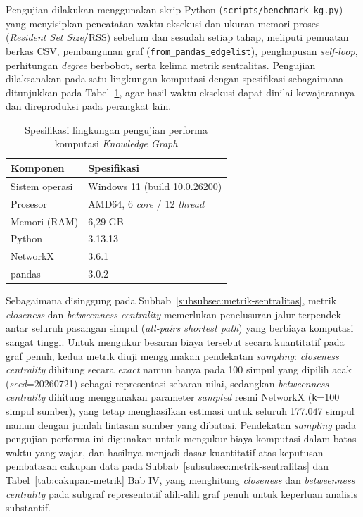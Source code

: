 Pengujian dilakukan menggunakan skrip Python (\texttt{scripts/}\allowbreak\texttt{benchmark\_kg.py}) yang menyisipkan pencatatan waktu eksekusi dan ukuran memori proses (\textit{Resident Set Size}/RSS) sebelum dan sesudah setiap tahap, meliputi pemuatan berkas CSV, pembangunan graf (\texttt{from\_pandas\_}\allowbreak\texttt{edgelist}), penghapusan \textit{self-loop}, perhitungan \textit{degree} berbobot, serta kelima metrik sentralitas. Pengujian dilaksanakan pada satu lingkungan komputasi dengan spesifikasi sebagaimana ditunjukkan pada Tabel~\ref{tab:lingkungan-benchmark}, agar hasil waktu eksekusi dapat dinilai kewajarannya dan direproduksi pada perangkat lain.

\begin{table}[H]
\centering
\caption{Spesifikasi lingkungan pengujian performa komputasi \textit{Knowledge Graph}}
\label{tab:lingkungan-benchmark}
\renewcommand{\arraystretch}{1.3}
\begin{tabular}{|l|l|}
\hline
\textbf{Komponen} & \textbf{Spesifikasi} \\
\hline
Sistem operasi & Windows 11 (build 10.0.26200) \\
\hline
Prosesor & AMD64, 6 \textit{core} / 12 \textit{thread} \\
\hline
Memori (RAM) & 6,29 GB \\
\hline
Python & 3.13.13 \\
\hline
NetworkX & 3.6.1 \\
\hline
pandas & 3.0.2 \\
\hline
\end{tabular}
\end{table}

\begin{sloppypar}
Sebagaimana disinggung pada Subbab~\ref{subsubsec:metrik-sentralitas}, metrik \textit{closeness} dan \textit{betweenness centrality} memerlukan penelusuran jalur terpendek antar seluruh pasangan simpul (\textit{all-pairs shortest path}) yang berbiaya komputasi sangat tinggi. Untuk mengukur besaran biaya tersebut secara kuantitatif pada graf penuh, kedua metrik diuji menggunakan pendekatan \textit{sampling}: \textit{closeness centrality} dihitung secara \textit{exact} namun hanya pada 100 simpul yang dipilih acak (\textit{seed}=20260721) sebagai representasi sebaran nilai, sedangkan \textit{betweenness centrality} dihitung menggunakan parameter \textit{sampled} resmi NetworkX (\texttt{k}=100 simpul sumber), yang tetap menghasilkan estimasi untuk seluruh 177.047 simpul namun dengan jumlah lintasan sumber yang dibatasi. Pendekatan \textit{sampling} pada pengujian performa ini digunakan untuk mengukur biaya komputasi dalam batas waktu yang wajar, dan hasilnya menjadi dasar kuantitatif atas keputusan pembatasan cakupan data pada Subbab~\ref{subsubsec:metrik-sentralitas} dan Tabel~\ref{tab:cakupan-metrik} Bab IV, yang menghitung \textit{closeness} dan \textit{betweenness centrality} pada subgraf representatif alih-alih graf penuh untuk keperluan analisis substantif.
\end{sloppypar}


